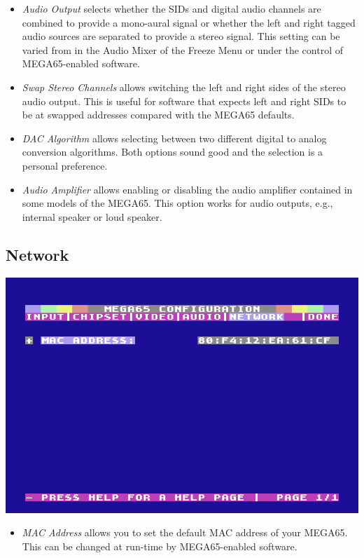 \begin{itemize}
  \item{\em Audio Output} selects whether the SIDs and digital audio channels are combined to provide a mono-aural signal or whether the left and right tagged audio sources are separated to provide a stereo signal. This setting can be varied from in the Audio Mixer of the Freeze Menu or under the control of MEGA65-enabled software.
  \item{\em Swap Stereo Channels} allows switching the left and right sides of the stereo audio output. This is useful for software that expects left and right SIDs to be at swapped addresses compared with the MEGA65 defaults.
  \item{\em DAC Algorithm} allows selecting between two different digital to analog conversion algorithms. Both options sound good and the selection is a personal preference.
  \item{\em Audio Amplifier} allows enabling or disabling the audio amplifier contained in some models of the MEGA65. This option works for audio outputs, e.g., internal speaker or loud speaker.
\end{itemize}

\subsection{Network}

\includegraphics[width=\linewidth]{images/ss-m65config-5.png}

\begin{itemize}
  \item{\em MAC Address} allows you to set the default MAC address of your MEGA65. This can be changed at run-time by MEGA65-enabled software.
\end{itemize}

